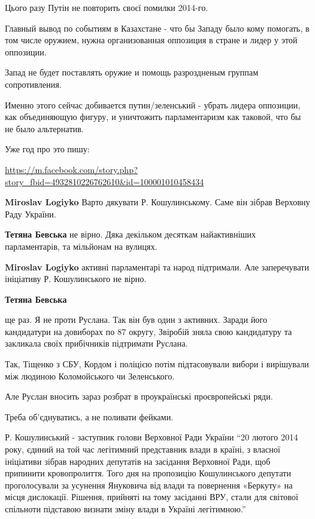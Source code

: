 \begin{itemize}
Цього разу Путін не повторить своєї помилки 2014-го.

Главный вывод по событиям в Казахстане - что бы Западу было кому помогать, в
том числе оружием, нужна организованная оппозиция в стране и лидер у этой
оппозиции.

Запад не будет поставлять оружие и помощь разроздненым группам сопротивления.

Именно этого сейчас добивается путин/зеленський - убрать лидера оппозиции, как
объединяющую фигуру, и уничтожить парламентаризм как таковой, что бы не было
альтернатив.

Уже год про это пишу:

\url{https://m.facebook.com/story.php?story_fbid=4932810226762610&id=100001010458434}

\begin{itemize} %
\textbf{Miroslav Logiyko} Варто дякувати Р. Кошулинському. Саме він зібрав Верховну Раду України.

\begin{itemize} %
\textbf{Тетяна Бевська} не вірно. Дяка декільком десяткам найактивніших парламентарів, та мільйонам на вулицях.

\textbf{Miroslav Logiyko} активні парламентарі та народ підтримали. Але заперечувати ініціативу Р. Кошулинського не вірно.

\textbf{Тетяна Бевська} 

ще раз. Я не проти Руслана. Так він був один з активних. Заради його
кандидатури на довиборах по 87 округу, Звіробій зняла свою кандидатуру та
закликала своїх прибічників підтримати Руслана.

Так, Тіщенко з СБУ, Кордом і поліцією потім підтасовували вибори і вирішували
між людиною Коломойського чи Зеленського.

Але Руслан вносить зараз розбрат в проукраїнські проєвропейські ряди.

Треба об'єднуватись, а не поливати фейками.



Р. Кошулинський - заступник голови Верховної Ради України \enquote{20 лютого 2014 року,
єдиний на той час легітимний представник влади в країні, з власної ініціативи
зібрав народних депутатів на засідання Верховної Ради, щоб припинити
кровопролиття. Того дня на пропозицію Кошулинського депутати проголосували за
усунення Януковича від влади та повернення «Беркуту» на місця дислокації.
Рішення, прийняті на тому засіданні ВРУ, стали для світової спільноти підставою
визнати зміну влади в Україні легітимною.}


\end{itemize}
\end{itemize}
\end{itemize}
